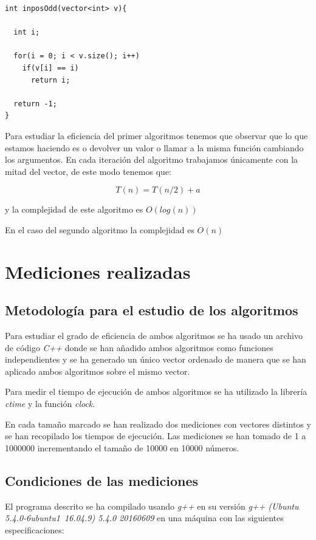 \documentclass{article}
\begin{document}
\begin{lstlisting}
int inposOdd(vector<int> v){

  int i;

  for(i = 0; i < v.size(); i++)
    if(v[i] == i)
      return i;

  return -1;
}
\end{lstlisting}

Para estudiar la eficiencia del primer algoritmos tenemos que observar que lo que estamos haciendo es o devolver un valor o llamar a la misma función cambiando los argumentos. En cada iteración del algoritmo trabajamos únicamente con la mitad del vector, de este modo tenemos que:

\[
  T(n) = T(n/2) + a
\]

y la complejidad de este algoritmo es $O(log(n))$

En el caso del segundo algoritmo la complejidad es $O(n)$

\section{Mediciones realizadas}

\subsection{Metodología para el estudio de los algoritmos}

Para estudiar el grado de eficiencia de ambos algoritmos se ha usado
un archivo de código \textit{C++} donde se han añadido ambos
algoritmos como funciones independientes y se ha generado un único
vector ordenado de manera que se han aplicado ambos algoritmos sobre
el mismo vector.

Para medir el tiempo de ejecución de ambos algoritmos se ha utilizado
la librería \textit{ctime} y la función \textit{clock}.

En cada tamaño marcado se han realizado dos mediciones con vectores
distintos y se han recopilado los tiempos de ejecución. Las mediciones
se han tomado de 1 a 1000000 incrementando el tamaño de 10000 en
10000 números.

\subsection{Condiciones de las mediciones}

El programa descrito se ha compilado usando \textit{g++} en su versión
\textit{g++ (Ubuntu 5.4.0-6ubuntu1~16.04.9) 5.4.0 20160609} en una máquina con las siguientes especificaciones:
\end{document}
